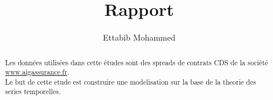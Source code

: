 \documentclass{Math}
\begin{document}
\frontmatter
\title{Rapport}
\author{Ettabib Mohammed}
\maketitle
\mainmatter

    \french
  \begin{abstract}
      Les données utilisées dans cette études sont des spreads de contrats CDS
      de la société \url{www.aigassurance.fr}. \\
      Le but de cette etude est construire une modelisation sur la base de la
      theorie des series temporelles.\\
  \end{abstract}

% 
\backmatter
\tableofcontents
\end{document}
